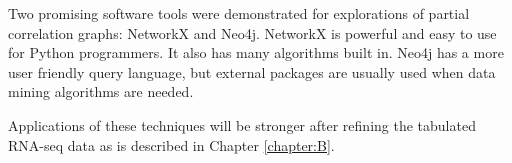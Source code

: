 Two promising software tools were demonstrated for explorations of partial correlation graphs: NetworkX and Neo4j.
NetworkX is powerful and easy to use for Python programmers.  It also has many algorithms built in.
Neo4j has a more user friendly query language, but external packages are usually used when data mining algorithms are needed.

Applications of these techniques will be stronger after refining the tabulated RNA-seq data as is described in Chapter \ref{chapter:B}.

